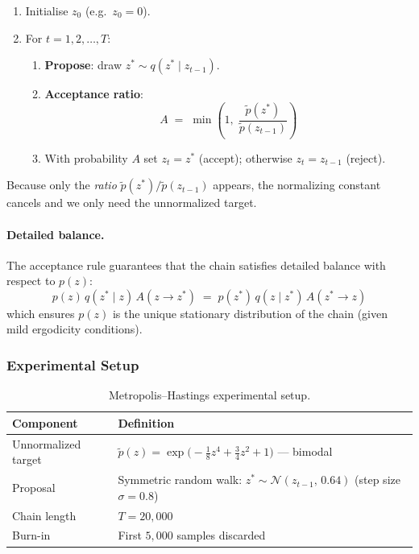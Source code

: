 \documentclass[12pt, a4paper]{article}
\begin{document}
\begin{enumerate}
    \item Initialise $z_0$ (e.g.\ $z_0 = 0$).
    \item For $t = 1, 2, \ldots, T$:
    \begin{enumerate}
        \item \textbf{Propose}: draw
              $z^* \sim q(z^* \mid z_{t-1})$.
        \item \textbf{Acceptance ratio}:
              \begin{equation}
                  A \;=\; \min\!\left(1,\;
                  \frac{\tilde{p}(z^*)}{\tilde{p}(z_{t-1})}
                  \right)
                  \label{eq:mh_accept}
              \end{equation}
        \item With probability $A$ set $z_t = z^*$ (accept);
              otherwise $z_t = z_{t-1}$ (reject).
    \end{enumerate}
\end{enumerate}

Because only the \emph{ratio}
$\tilde{p}(z^*)/\tilde{p}(z_{t-1})$ appears, the normalizing
constant cancels and we only need the unnormalized target.

\paragraph{Detailed balance.}
The acceptance rule guarantees that the chain satisfies detailed
balance with respect to $p(z)$:
\begin{equation}
    p(z)\,q(z^* \mid z)\,A(z \to z^*)
    \;=\;
    p(z^*)\,q(z \mid z^*)\,A(z^* \to z)
    \label{eq:detailed_balance}
\end{equation}
which ensures $p(z)$ is the unique stationary distribution of the
chain (given mild ergodicity conditions).

\subsubsection{Experimental Setup}

\begin{table}[H]
    \centering
    \begin{tabular}{ll}
        \toprule
        \textbf{Component} & \textbf{Definition} \\
        \midrule
        Unnormalized target
            & $\tilde{p}(z) = \exp\!\bigl(-\tfrac{1}{8}z^4
              + \tfrac{3}{4}z^2 + 1\bigr)$ --- bimodal \\
        Proposal
            & Symmetric random walk:
              $z^* \sim \mathcal{N}(z_{t-1},\, 0.64)$
              (step size $\sigma = 0.8$) \\
        Chain length
            & $T = 20{,}000$ \\
        Burn-in
            & First $5{,}000$ samples discarded \\
        \bottomrule
    \end{tabular}
    \caption{Metropolis--Hastings experimental setup.}
    \label{tab:mh_setup}
\end{table}
\end{document}

